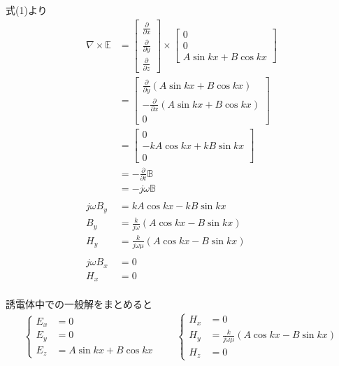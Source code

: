 \documentclass[a4paper,10pt]{bxjsarticle}
\begin{document}
式(1)より
\begin{align*}
    \nabla \times \mathbb{E} 
    & = \begin{bmatrix}
        \frac{\partial}{\partial x}\\
        \frac{\partial}{\partial y}\\
        \frac{\partial}{\partial z}
    \end{bmatrix} \times
    \begin{bmatrix}
        0 \\
        0 \\
        A \sin k x + B \cos k x
    \end{bmatrix} \\
    & = \begin{bmatrix}
        \frac{\partial}{\partial y}(A \sin k x + B \cos k x) \\
        - \frac{\partial}{\partial x}(A \sin k x + B \cos k x) \\
        0 
    \end{bmatrix} \\
    & = \begin{bmatrix}
        0 \\
        - k A \cos kx + k B \sin kx \\
        0 
    \end{bmatrix} \\
    &= - \frac{\partial}{\partial t} \mathbb{B} \\
    &= - j \omega \mathbb{B} \\
    \\
    j \omega B_y &= kA\cos kx - kB\sin kx \\
    B_y &= \frac{k}{j \omega} (A \cos kx - B \sin kx) \\
    H_y &= \frac{k}{j \omega \mu} (A \cos kx - B \sin kx) \\
    \\
    j \omega B_x &= 0 \\
    H_x &= 0 \\
\end{align*}

誘電体中での一般解をまとめると
\begin{align*}
    \begin{cases}
        E_x &= 0 \\
        E_y &= 0 \\
        E_z &= A \sin k x + B \cos k x
    \end{cases} \qquad
    \begin{cases}
        H_x &= 0\\
        H_y &= \frac{k}{j \omega \mu} (A \cos kx - B \sin kx)\\
        H_z &= 0
    \end{cases}
\end{align*}
\end{document}
